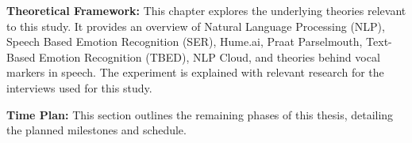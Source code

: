 \textbf{Theoretical Framework:} This chapter explores the underlying theories relevant to this study. It provides an overview of Natural Language Processing (NLP), Speech Based Emotion Recognition (SER), Hume.ai, Praat Parselmouth, Text-Based Emotion Recognition (TBED), NLP Cloud, and theories behind vocal markers in speech. The experiment is explained with relevant research for the interviews used for this study. 

\textbf{Time Plan:} This section outlines the remaining phases of this thesis, detailing the planned milestones and schedule. 

